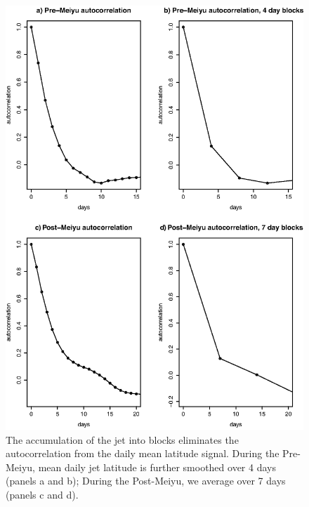 \begin{figure}[htbp]
\centering
\includegraphics[width=32pc]{Figures/ch4/jet_autocorr}
\caption{The accumulation of the jet into blocks eliminates the autocorrelation from the daily mean latitude signal. During the Pre-Meiyu, mean daily jet latitude is further smoothed over 4 days (panels a and b); During the Post-Meiyu, we average over 7 days (panels c and d).}
\label{fig:jet_autocorr}
\end{figure}
